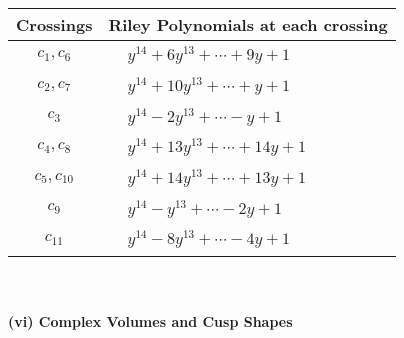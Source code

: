 \documentclass[1p]{elsarticle_modified}
\theoremstyle{definition}
\begin{document}
\begin{tabular}{m{50pt}|m{274pt}}
Crossings & \hspace{64pt}Riley Polynomials at each crossing \\
\hline $$\begin{aligned}c_{1},c_{6}\end{aligned}$$&$\begin{aligned}
&y^{14}+6 y^{13}+\cdots+9 y+1
\end{aligned}$\\
\hline $$\begin{aligned}c_{2},c_{7}\end{aligned}$$&$\begin{aligned}
&y^{14}+10 y^{13}+\cdots+y+1
\end{aligned}$\\
\hline $$\begin{aligned}c_{3}\end{aligned}$$&$\begin{aligned}
&y^{14}-2 y^{13}+\cdots- y+1
\end{aligned}$\\
\hline $$\begin{aligned}c_{4},c_{8}\end{aligned}$$&$\begin{aligned}
&y^{14}+13 y^{13}+\cdots+14 y+1
\end{aligned}$\\
\hline $$\begin{aligned}c_{5},c_{10}\end{aligned}$$&$\begin{aligned}
&y^{14}+14 y^{13}+\cdots+13 y+1
\end{aligned}$\\
\hline $$\begin{aligned}c_{9}\end{aligned}$$&$\begin{aligned}
&y^{14}- y^{13}+\cdots-2 y+1
\end{aligned}$\\
\hline $$\begin{aligned}c_{11}\end{aligned}$$&$\begin{aligned}
&y^{14}-8 y^{13}+\cdots-4 y+1
\end{aligned}$\\
\hline
\end{tabular}\\~\\
\newpage\flushleft \textbf{(vi) Complex Volumes and Cusp Shapes}
\end{document}
